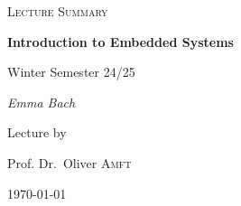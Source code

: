 \begin{titlepage}
	\centering
	{\Large \textsc{Lecture Summary}\par}
	\vspace{0.5cm}
	{\huge\bfseries Introduction to Embedded Systems\par}
	\vspace{1cm}
    {\Large Winter Semester 24/25\par}
    \vspace{1cm}
	{\Large\itshape Emma Bach\par}
	\vfill
	Lecture by\par
	Prof. Dr.~Oliver \textsc{Amft}

	\vfill

	{\large \today\par}
\end{titlepage}